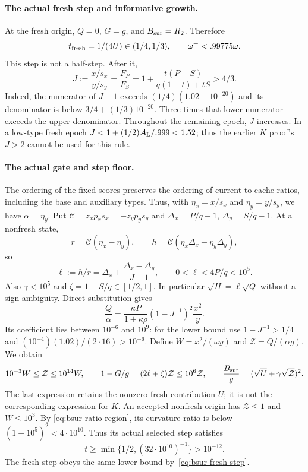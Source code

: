 \paragraph{The actual fresh step and informative growth.}
At the fresh origin, $Q=0$, $G=g$, and $B_{\rm sur}=R_2$. Therefore
\begin{equation}\label{eq:bsur-fresh-step}
 t_{\rm fresh}=1/(4U)\in(1/4,1/3),\qquad
 \omega^+<.99775\omega.
\end{equation}
This step is not a half-step. After it,
\[
 J:=\frac{x/s_x}{y/s_y}
 =\frac{F_P}{F_S}
 =1+\frac{t(P-S)}{q(1-t)+tS}>4/3.
\]
Indeed, the numerator of $J-1$ exceeds $(1/4)(1.02-10^{-20})$ and its
denominator is below $3/4+(1/3)10^{-20}$. Three times that lower numerator
exceeds the upper denominator. Throughout the remaining epoch, $J$ increases.
In a low-type fresh epoch $J<1+(1/2)\mathcal A_{\rm L}/.999<1.52$;
thus the earlier $K$ proof's $J>2$ cannot be used for this rule.

\paragraph{The actual gate and step floor.}
The ordering of the fixed scores preserves the ordering of current-to-cache
ratios, including the base and auxiliary types. Thus, with
$\eta_x=x/s_x$ and $\eta_y=y/s_y$, we have $\alpha=\eta_y$.
Put $\mathcal C=z_xp_xs_x=-z_yp_ys_y$ and
$\Delta_x=P/q-1$, $\Delta_y=S/q-1$. At a nonfresh state,
\[
 r=\mathcal C(\eta_x-\eta_y),\qquad
 h=\mathcal C(\eta_x\Delta_x-\eta_y\Delta_y),
\]
so
\[
 \ell:=h/r=\Delta_x+\frac{\Delta_x-\Delta_y}{J-1},
 \qquad 0<\ell<4P/q<10^5.
\]
Also $\gamma<10^5$ and $\zeta=1-S/q\in[1/2,1]$. In particular
$\sqrt H=\ell\sqrt Q$ without a sign ambiguity. Direct substitution gives
\begin{equation}\label{eq:bsur-qalpha}
 \frac Q\alpha=
 \frac{\kappa P}{1+\kappa\rho}(1-J^{-1})^2\frac{x^2}{y}.
\end{equation}
Its coefficient lies between $10^{-6}$ and $10^9$: for the lower bound use
$1-J^{-1}>1/4$ and
$(10^{-4})(1.02)/(2\cdot16)>10^{-6}$.
Define $W=x^2/(\omega y)$ and $\mathcal Z=Q/(\alpha g)$. We obtain
\begin{equation}\label{eq:bsur-gate-ratios}
 10^{-3}W\le\mathcal Z\le10^{14}W,\qquad
 1-G/g=(2\ell+\zeta)\mathcal Z\le10^6\mathcal Z,
 \qquad
 \frac{B_{\rm sur}}g=(\sqrt U+\gamma\sqrt{\mathcal Z})^2.
\end{equation}
The last expression retains the nonzero fresh contribution $U$; it is not the
corresponding expression for $K$.
An accepted nonfresh origin has $\mathcal Z\le1$ and $W\le10^3$. By
\eqref{eq:bsur-ratio-region}, its curvature ratio is below
$(1+10^5)^2<4\cdot10^{10}$. Thus its actual selected step satisfies
\begin{equation}\label{eq:bsur-step-floor}
 t\ge\min\{1/2,(32\cdot10^{10})^{-1}\}>10^{-12}.
\end{equation}
The fresh step obeys the same lower bound by~\eqref{eq:bsur-fresh-step}.

